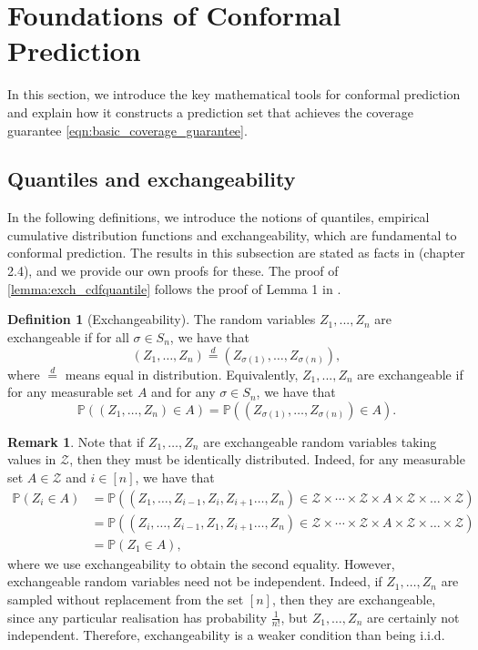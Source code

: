 \documentclass[11pt, titlepage]{article} %
\newcommand{\Prob}[1]{\mathbb{P}\left( #1 \right)}
\numberwithin{equation}{section}
\theoremstyle{definition}
\newtheorem{definition}{Definition}
\newtheorem{remark}{Remark}
\numberwithin{theorem}{section}
\numberwithin{lemma}{section}
\numberwithin{corollary}{section}
\numberwithin{proposition}{section}
\numberwithin{definition}{section}
\numberwithin{remark}{section}
\begin{document}
\section{Foundations of Conformal Prediction}
\label{sec:foundations_of_CP}

\noindent
In this section, we introduce the key mathematical tools for conformal prediction and explain how it constructs a prediction set that achieves the coverage guarantee \eqref{eqn:basic_coverage_guarantee}.

\subsection{Quantiles and exchangeability}
\label{subsec:quantiles_and_exchangeability}

In the following definitions, we introduce the notions of quantiles, empirical cumulative distribution functions and exchangeability, which are fundamental to conformal prediction. The results in this subsection are stated as facts in \cite{angelopoulos2024theoreticalfoundationsconformalprediction} (chapter 2.4), and we provide our own proofs for these. The proof of \cref{lemma:exch_cdfquantile} follows the proof of Lemma 1 in \cite{romano2019_CQR}.

\begin{definition}[Exchangeability]
    The random variables \(Z_1, ..., Z_n\) are exchangeable if for all \(\sigma \in S_n\), we have that \[(Z_1, \ldots, Z_n) \overset{d}{=} (Z_{\sigma(1)}, \ldots, Z_{\sigma(n)}),\] where \(\overset{d}{=}\) means equal in distribution. Equivalently, \(Z_1, ..., Z_n\) are exchangeable if for any measurable set \(A\) and for any \(\sigma \in S_n\), we have that \[\Prob{(Z_1, \ldots, Z_n) \in A} = \Prob{(Z_{\sigma(1)}, \ldots, Z_{\sigma(n)}) \in A}.\]
\label{defn:exch}
\end{definition}

\begin{remark}
Note that if \(Z_1, \ldots, Z_n\) are exchangeable random variables taking values in \(\mathcal{Z}\), then they must be identically distributed. Indeed, for any measurable set \(A \in \mathcal{Z}\) and \(i \in [n]\), we have that \begin{align*} 
    \Prob{Z_i \in A} &= \Prob{(Z_1, \ldots, Z_{i-1}, Z_i, Z_{i+1} \ldots, Z_n) \in \mathcal{Z} \times \cdots \times \mathcal{Z} \times A \times \mathcal{Z} \times \ldots \times \mathcal{Z}} \\
    &= \Prob{(Z_i, \ldots, Z_{i-1}, Z_1, Z_{i+1} \ldots, Z_n) \in \mathcal{Z} \times \cdots \times \mathcal{Z} \times A \times \mathcal{Z} \times \ldots \times \mathcal{Z}} \\
    &= \Prob{Z_1 \in A},
\end{align*} where we use exchangeability to obtain the second equality. However, exchangeable random variables need not be independent. Indeed, if \(Z_1, \ldots, Z_n\) are sampled without replacement from the set \([n]\), then they are exchangeable, since any particular realisation has probability \(\frac{1}{n!}\), but \(Z_1, \ldots, Z_n\) are certainly not independent. Therefore, exchangeability is a weaker condition than being i.i.d.
\label{rmk:exch_dist}
\end{remark}
\end{document}
